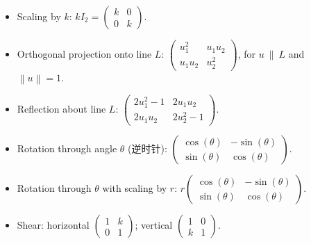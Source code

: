 \begin{itemize}
\tightlist
\item
  Scaling by \(k\): \(kI_{2} = \begin{pmatrix}
  k & 0 \\
  0 & k
  \end{pmatrix}\).
\item
  Orthogonal projection onto line \(L\): \(\begin{pmatrix}
  u_{1}^{2} & {u_{1}u_{2}} \\
  {u_{1}u_{2}} & u_{2}^{2}
  \end{pmatrix}\), for \(u\ \|\ L\) and \(\left\| u \right\| = 1\).
\item
  Reflection about line \(L\): \(\begin{pmatrix}
  {2u_{1}^{2} - 1} & {2u_{1}u_{2}} \\
  {2u_{1}u_{2}} & {2u_{2}^{2} - 1}
  \end{pmatrix}\).
\item
  Rotation through angle \(\theta\) (逆时针): \(\begin{pmatrix}
  {\cos(\theta)} & {- \sin(\theta)} \\
  {\sin(\theta)} & {\cos(\theta)}
  \end{pmatrix}\).
\item
  Rotation through \(\theta\) with scaling by \(r\): \(r\begin{pmatrix}
  {\cos(\theta)} & {- \sin(\theta)} \\
  {\sin(\theta)} & {\cos(\theta)}
  \end{pmatrix}\).
\item
  Shear: horizontal \(\begin{pmatrix}
  1 & k \\
  0 & 1
  \end{pmatrix}\); vertical \(\begin{pmatrix}
  1 & 0 \\
  k & 1
  \end{pmatrix}\).
\end{itemize}

